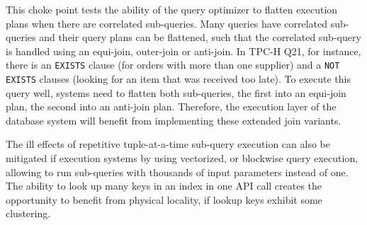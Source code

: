 
This choke point tests the ability of the query optimizer to flatten execution
plans when there are correlated sub-queries. Many queries have correlated
sub-queries and their query plans can be flattened, such that the correlated
sub-query is handled using an equi-join, outer-join or anti-join. In TPC-H Q21,
for instance, there is an \lstinline{EXISTS} clause (for orders with more than
one supplier) and a \lstinline{NOT EXISTS} clauses (looking for an item that was
received too late). To execute this query well, systems need to flatten both
sub-queries, the first into an equi-join plan, the second into an anti-join
plan. Therefore, the execution layer of the database system will benefit from
implementing these extended join variants.

The ill effects of repetitive tuple-at-a-time sub-query execution can also be
mitigated if execution systems by using vectorized, or blockwise query
execution, allowing to run sub-queries with thousands of input parameters
instead of one. The ability to look up many keys in an index in one API call
creates the opportunity to benefit from physical locality, if lookup keys
exhibit some clustering.


